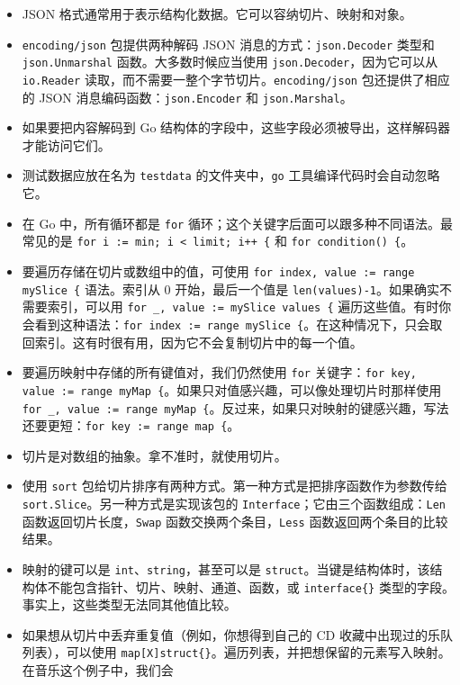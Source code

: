 \begin{itemize}
\item JSON 格式通常用于表示结构化数据。它可以容纳切片、映射和对象。
\item \texttt{encoding/json} 包提供两种解码 JSON 消息的方式：\texttt{json.Decoder} 类型和 \texttt{json.Unmarshal} 函数。大多数时候应当使用 \texttt{json.Decoder}，因为它可以从 \texttt{io.Reader} 读取，而不需要一整个字节切片。\texttt{encoding/json} 包还提供了相应的 JSON 消息编码函数：\texttt{json.Encoder} 和 \texttt{json.Marshal}。
\item 如果要把内容解码到 Go 结构体的字段中，这些字段必须被导出，这样解码器才能访问它们。
\item 测试数据应放在名为 \texttt{testdata} 的文件夹中，\texttt{go} 工具编译代码时会自动忽略它。
\item 在 Go 中，所有循环都是 \texttt{for} 循环；这个关键字后面可以跟多种不同语法。最常见的是 \texttt{for i := min; i < limit; i++ \{} 和 \texttt{for condition() \{}。
\item 要遍历存储在切片或数组中的值，可使用 \texttt{for index, value := range mySlice \{} 语法。索引从 0 开始，最后一个值是 \texttt{len(values)-1}。如果确实不需要索引，可以用 \texttt{for \_, value := mySlice values \{} 遍历这些值。有时你会看到这种语法：\texttt{for index := range mySlice \{}。在这种情况下，只会取回索引。这有时很有用，因为它不会复制切片中的每一个值。
\item 要遍历映射中存储的所有键值对，我们仍然使用 \texttt{for} 关键字：\texttt{for key, value := range myMap \{}。如果只对值感兴趣，可以像处理切片时那样使用 \texttt{for \_, value := range myMap \{}。反过来，如果只对映射的键感兴趣，写法还要更短：\texttt{for key := range map \{}。
\item 切片是对数组的抽象。拿不准时，就使用切片。
\item 使用 \texttt{sort} 包给切片排序有两种方式。第一种方式是把排序函数作为参数传给 \texttt{sort.Slice}。另一种方式是实现该包的 \texttt{Interface}；它由三个函数组成：\texttt{Len} 函数返回切片长度，\texttt{Swap} 函数交换两个条目，\texttt{Less} 函数返回两个条目的比较结果。
\item 映射的键可以是 \texttt{int}、\texttt{string}，甚至可以是 \texttt{struct}。当键是结构体时，该结构体不能包含指针、切片、映射、通道、函数，或 \texttt{interface\{\}} 类型的字段。事实上，这些类型无法同其他值比较。
\item 如果想从切片中丢弃重复值（例如，你想得到自己的 CD 收藏中出现过的乐队列表），可以使用 \texttt{map[X]struct\{\}}。遍历列表，并把想保留的元素写入映射。在音乐这个例子中，我们会

\end{itemize}
